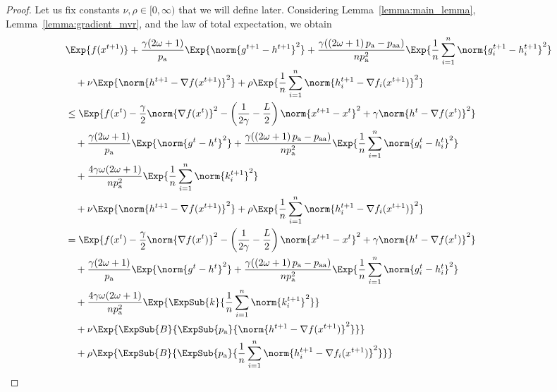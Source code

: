 \documentclass{article}
\newcommand*{\probavailable}{\ensuremath{p_{\textnormal{a}}}}
\newcommand*{\probpairaa}{\ensuremath{p_{\textnormal{aa}}}}
\begin{document}
\CONVERGENCEMVR*

\begin{proof}
  Let us fix constants $\nu, \rho \in [0,\infty)$ that we will define later. Considering Lemma~\ref{lemma:main_lemma}, Lemma~\ref{lemma:gradient_mvr}, and the law of total expectation, we obtain
    \begin{align*}
      &\Exp{f(x^{t + 1})} + \frac{\gamma (2 \omega + 1)}{\probavailable} \Exp{\norm{g^{t+1} - h^{t+1}}^2} + \frac{\gamma (\left(2 \omega + 1\right)\probavailable - \probpairaa)}{n \probavailable^2} \Exp{\frac{1}{n}\sum_{i=1}^n\norm{g^{t+1}_i - h^{t+1}_i}^2}\\
      &\quad  + \nu \Exp{\norm{h^{t+1} - \nabla f(x^{t+1})}^2} + \rho \Exp{\frac{1}{n}\sum_{i=1}^n\norm{h^{t+1}_i - \nabla f_i(x^{t+1})}^2}\\
      &\leq \Exp{f(x^t) - \frac{\gamma}{2}\norm{\nabla f(x^t)}^2 - \left(\frac{1}{2\gamma} - \frac{L}{2}\right)
      \norm{x^{t+1} - x^t}^2 + \gamma \norm{h^{t} - \nabla f(x^t)}^2}\nonumber\\
      &\quad + \frac{\gamma (2 \omega + 1)}{\probavailable}\Exp{\norm{g^{t} - h^t}^2}+ \frac{\gamma (\left(2 \omega + 1\right)\probavailable - \probpairaa)}{n \probavailable^2}\Exp{\frac{1}{n} \sum_{i=1}^n\norm{g^t_i - h^{t}_i}^2} \\
      &\quad + \frac{4 \gamma \omega (2 \omega + 1)}{n \probavailable^2} \Exp{\frac{1}{n} \sum_{i=1}^n\norm{k^{t+1}_i}^2} \\
      &\quad  + \nu \Exp{\norm{h^{t+1} - \nabla f(x^{t+1})}^2} + \rho \Exp{\frac{1}{n}\sum_{i=1}^n\norm{h^{t+1}_i - \nabla f_i(x^{t+1})}^2}\\
      &= \Exp{f(x^t) - \frac{\gamma}{2}\norm{\nabla f(x^t)}^2 - \left(\frac{1}{2\gamma} - \frac{L}{2}\right)
      \norm{x^{t+1} - x^t}^2 + \gamma \norm{h^{t} - \nabla f(x^t)}^2}\nonumber\\
      &\quad + \frac{\gamma (2 \omega + 1)}{\probavailable}\Exp{\norm{g^{t} - h^t}^2}+ \frac{\gamma (\left(2 \omega + 1\right)\probavailable - \probpairaa)}{n \probavailable^2}\Exp{\frac{1}{n} \sum_{i=1}^n\norm{g^t_i - h^{t}_i}^2} \\
      &\quad + \frac{4 \gamma \omega (2 \omega + 1)}{n \probavailable^2} \Exp{\ExpSub{k}{\frac{1}{n} \sum_{i=1}^n\norm{k^{t+1}_i}^2}} \\
      &\quad  + \nu \Exp{\ExpSub{B}{\ExpSub{\probavailable}{\norm{h^{t+1} - \nabla f(x^{t+1})}^2}}} \\
      &\quad + \rho \Exp{\ExpSub{B}{\ExpSub{\probavailable}{\frac{1}{n}\sum_{i=1}^n\norm{h^{t+1}_i - \nabla f_i(x^{t+1})}^2}}}\\

\end{align*}
\end{proof}
\end{document}
